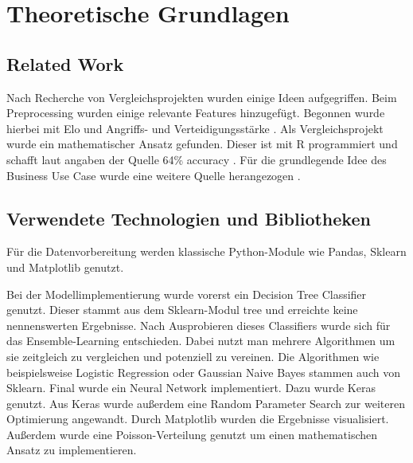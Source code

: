 \chapter{Theoretische Grundlagen}

\section{Related Work}
Nach Recherche von Vergleichsprojekten wurden einige Ideen aufgegriffen. Beim Preprocessing wurden einige relevante Features hinzugefügt. Begonnen wurde hierbei mit Elo und Angriffs- und Verteidigungsstärke \autocite[Vgl.][]{Accso.14102021}. Als Vergleichsprojekt wurde ein mathematischer Ansatz gefunden. Dieser ist mit R programmiert und schafft laut angaben der Quelle 64\% accuracy \autocite[Vgl.][]{Doan.15.3.2019}. Für die grundlegende Idee des Business Use Case wurde eine weitere Quelle herangezogen \autocite[Vgl.][]{Hartley.05102022}.

\section{Verwendete Technologien und Bibliotheken}
Für die Datenvorbereitung werden klassische Python-Module wie Pandas, Sklearn und Matplotlib genutzt.

Bei der Modellimplementierung wurde vorerst ein Decision Tree Classifier genutzt. Dieser stammt aus dem Sklearn-Modul tree und erreichte keine nennenswerten Ergebnisse. Nach Ausprobieren dieses Classifiers wurde sich für das Ensemble-Learning entschieden. Dabei nutzt man mehrere Algorithmen um sie zeitgleich zu vergleichen und potenziell zu vereinen. Die Algorithmen wie beispielsweise Logistic Regression oder Gaussian Naive Bayes stammen auch von Sklearn. Final wurde ein Neural Network implementiert. Dazu wurde Keras genutzt. Aus Keras wurde außerdem eine Random Parameter Search zur weiteren Optimierung angewandt. Durch Matplotlib wurden die Ergebnisse visualisiert. Außerdem wurde eine Poisson-Verteilung genutzt um einen mathematischen Ansatz zu implementieren.